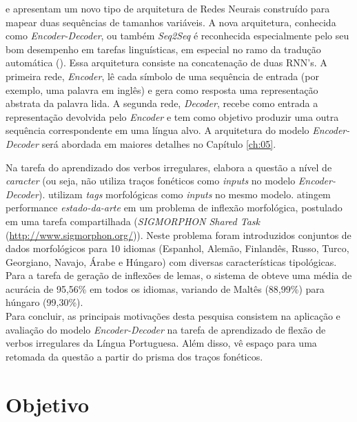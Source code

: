 \cite{enc-dec:2014} e \cite{seq2seq:2014} apresentam um novo tipo de arquitetura de Redes Neurais construído para mapear duas sequências de tamanhos variáveis. A nova arquitetura, conhecida como \textit{Encoder-Decoder}, ou também \textit{Seq2Seq} é reconhecida especialmente pelo seu bom desempenho em tarefas linguísticas, em especial no ramo da tradução automática (\cite{Wu:2016}). Essa arquitetura consiste na concatenação de duas RNN's. A primeira rede, \textit{Encoder}, lê cada símbolo de uma sequência de entrada (por exemplo, uma palavra em inglês) e gera como resposta uma representação abstrata da palavra lida. A segunda rede, \textit{Decoder}, recebe como entrada a representação devolvida pelo \textit{Encoder} e tem como objetivo produzir uma outra sequência correspondente em uma língua alvo. A arquitetura do modelo \textit{Encoder-Decoder} será abordada em maiores detalhes no Capítulo \ref{ch:05}.

Na tarefa do aprendizado dos verbos irregulares, \cite{faruqui:2015} elabora a questão a nível de \textit{caracter} (ou seja, não utiliza traços fonéticos como \textit{inputs} no modelo \textit{Encoder-Decoder}). \cite{kann-schutze-2016-med} utilizam \textit{tags} morfológicas como \textit{inputs} no mesmo modelo. \cite{cotterell-sigmorphon2016} atingem performance \textit{estado-da-arte} em um problema de inflexão morfológica, postulado em uma tarefa compartilhada (\textit{SIGMORPHON Shared Task} (\url{http://www.sigmorphon.org/})). Neste problema foram introduzidos conjuntos de dados morfológicos para 10 idiomas (Espanhol, Alemão, Finlandês, Russo, Turco, Georgiano, Navajo, Árabe e Húngaro) com diversas características tipológicas. Para a tarefa de geração de inflexões de lemas, o sistema de \cite{cotterell-sigmorphon2016} obteve uma média de acurácia de 95,56\% em todos os idiomas, variando de
Maltês (88,99\%) para húngaro (99,30\%).\\

Para concluir, as principais motivações desta pesquisa consistem na aplicação e avaliação do modelo \textit{Encoder-Decoder} na tarefa de aprendizado de flexão de verbos irregulares da Língua Portuguesa. Além disso, vê espaço para uma retomada da questão a partir do prisma dos traços fonéticos. 

\section{Objetivo}
\label{sec:objectives}

